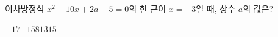이차방정식 $x^2-10x+2a-5=0$의 한 근이 $x=-3$일 때, 상수 $a$의 값은?
\begin{choices32}{$-17$}{$-15$}{$8$}{$13$}{$15$}\end{choices32}
